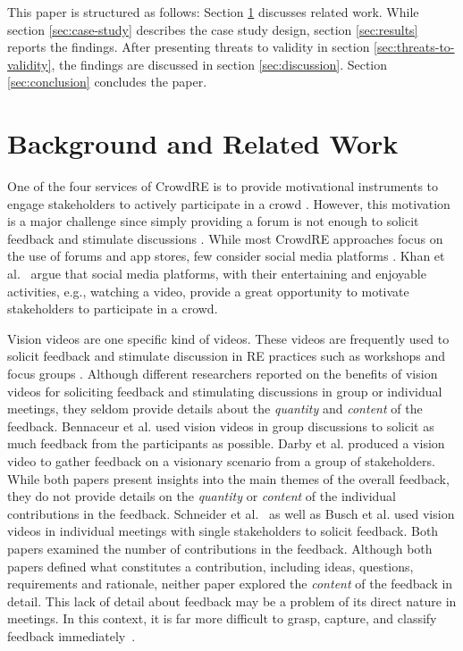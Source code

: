 \documentclass[conference]{IEEEtran}
\begin{document}
This paper is structured as follows: Section \ref{sec:background-and-related-work} discusses related work. While section \ref{sec:case-study} describes the case study design, section \ref{sec:results} reports the findings. After presenting threats to validity in section \ref{sec:threats-to-validity}, the findings are discussed in section \ref{sec:discussion}. Section \ref{sec:conclusion} concludes the paper.

\section{Background and Related Work}
\label{sec:background-and-related-work}
One of the four services of CrowdRE is to provide motivational instruments to engage stakeholders to actively participate in a crowd \cite{Groen.2016}. However, this motivation is a major challenge since simply providing a forum is not enough to solicit feedback and stimulate discussions \cite{Stade.2017}. While most CrowdRE approaches focus on the use of forums and app stores, few consider social media platforms \cite{Khan.2019, Wang.2019, Lim.2021}. Khan et al.~\cite{Khan.2019} argue that social media platforms, with their entertaining and enjoyable activities, e.g., watching a video, provide a great opportunity to motivate stakeholders to participate in a crowd.

Vision videos are one specific kind of videos. These videos are frequently used to solicit feedback and stimulate discussion in RE practices such as workshops and focus groups \cite{Karras.2020d, Karras.2018b, Broll.2007}. Although different researchers \cite{Bennaceur.2016, Darby.2018, Schneider.2019, Busch.2020} reported on the benefits of vision videos for soliciting feedback and stimulating discussions in group or individual meetings, they seldom provide details about the \textit{quantity} and \textit{content} of the feedback.
Bennaceur et al. \cite{Bennaceur.2016} used vision videos in group discussions to solicit as much feedback from the participants as possible. Darby et al. \cite{Darby.2018} produced a vision video to gather feedback on a visionary scenario from a group of stakeholders. While both papers present insights into the main themes of the overall feedback, they do not provide details on the \textit{quantity} or \textit{content} of the individual contributions in the feedback. Schneider et al.~\cite{Schneider.2019} as well as Busch et al. \cite{Busch.2020} used vision videos in individual meetings with single stakeholders to solicit feedback. Both papers examined the number of contributions in the feedback. Although both papers defined what constitutes a contribution, including ideas, questions, requirements and rationale, neither paper explored the \textit{content} of the feedback in detail.
This lack of detail about feedback may be a problem of its direct nature in meetings. In this context, it is far more difficult to grasp, capture, and classify feedback immediately~\cite{Karras.2016a}.
\end{document}
